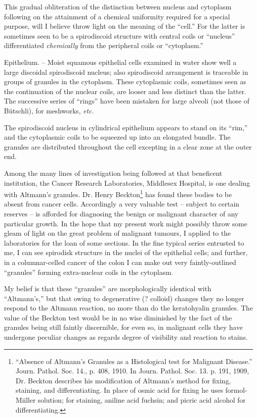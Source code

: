 \documentclass[a4paper, 12pt, oneside]{article}
\begin{document}
This gradual obliteration of the distinction between nucleus and cytoplasm following on the attainment of a chemical uniformity required for a special purpose, will I believe throw light on the meaning of the ``cell.'' For the latter is sometimes seen to be a spirodiscoid structure with central coils or ``nucleus'' differentiated \emph{chemically} from the peripheral coils or ``cytoplasm.''

Epithelium. -- Moist squamous epithelial cells examined in water show well a large discoidal spirodiscoid nucleus; also spirodiscoid arrangement is traceable in groups of granules in the cytoplasm. These cytoplasmic coils, sometimes seen as the continuation of the nuclear coils, are looser and less distinct than the latter. The successive series of ``rings'' have been mistaken for large alveoli (not those of Bütschli), for meshworks, \emph{etc.}

The spirodiscoid nucleus in cylindrical epithelium appears to stand on its ``rim,'' and the cytoplasmic coils to be squeezed up into an elongated bundle. The granules are distributed throughout the cell excepting in a clear zone at the outer end.

Among the many lines of investigation being followed at that beneficent institution, the Cancer Research Laboratories, Middlesex Hospital, is one dealing with Altmann's granules. Dr. Henry Beckton\footnote{``Absence of Altmann's Granules as a Histological test for Malignant Disease.'' Journ. Pathol. Soc. 14., p. 408, 1910. In Journ. Pathol. Soc. 13. p. 191, 1909, Dr. Beckton describes his modification of Altmann's method for fixing, staining, and differentiating. In place of osmic acid for fixing he uses formol-Miiller solution; for staining, aniline acid fuchsin; and picric acid alcohol for differentiating.} has found these bodies to be absent from cancer cells. Accordingly a very valuable test -- subject to certain reserves -- is afforded for diagnosing the benign or malignant character of any particular growth. In the hope that my present work might possibly throw some gleam of light on the great problem of malignant tumours, I applied to the laboratories for the loan of some sections. In the fine typical series entrusted to me, I can see spirodisk structure in the nuclei of the epithelial cells; and further, in a columnar-celled cancer of the colon I can make out very faintly-outlined ``granules'' forming extra-nuclear coils in the cytoplasm.

My belief is that these ``granules'' are morphologically identical with ``Altmann's,'' but that owing to degenerative (? colloid) changes they no longer respond to the Altmann reaction, no more than do the keratohyalin granules. The value of the Beckton test would be in no wise diminished by the fact of the granules being still faintly discernible, for even so, in malignant cells they have undergone peculiar changes as regards degree of visibility and reaction to stains.
\end{document}
